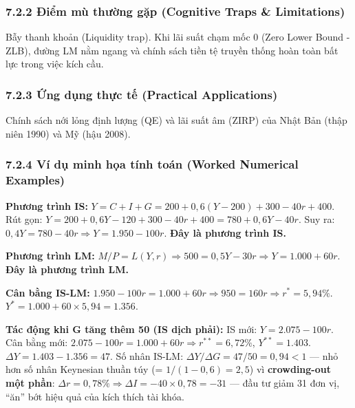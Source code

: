 \documentclass[
]{article}
\begin{document}
\subsubsection{7.2.2 Điểm mù thường gặp (Cognitive Traps \&
Limitations)}\label{ux111iux1ec3m-muxf9-thux1b0ux1eddng-gux1eb7p-cognitive-traps-limitations-34}

Bẫy thanh khoản (Liquidity trap). Khi lãi suất chạm mốc 0 (Zero Lower
Bound - ZLB), đường LM nằm ngang và chính sách tiền tệ truyền thống hoàn
toàn bất lực trong việc kích cầu.

\subsubsection{7.2.3 Ứng dụng thực tế (Practical
Applications)}\label{ux1ee9ng-dux1ee5ng-thux1ef1c-tux1ebf-practical-applications-18}

Chính sách nới lỏng định lượng (QE) và lãi suất âm (ZIRP) của Nhật Bản
(thập niên 1990) và Mỹ (hậu 2008).

\subsubsection{7.2.4 Ví dụ minh họa tính toán (Worked Numerical
Examples)}\label{vuxed-dux1ee5-minh-hux1ecda-tuxednh-touxe1n-worked-numerical-examples-17}

\textbf{Phương trình IS:}
\(Y = C + I + G = 200 + 0{,}6(Y-200) + 300 - 40r + 400\). Rút gọn:
\(Y = 200 + 0{,}6Y - 120 + 300 - 40r + 400 = 780 + 0{,}6Y - 40r\). Suy
ra: \(0{,}4Y = 780 - 40r \Rightarrow Y = 1.950 - 100r\). \textbf{Đây là
phương trình IS.}

\textbf{Phương trình LM:}
\(M/P = L(Y, r) \Rightarrow 500 = 0{,}5Y - 30r \Rightarrow Y = 1.000 + 60r\).
\textbf{Đây là phương trình LM.}

\textbf{Cân bằng IS-LM:}
\(1.950 - 100r = 1.000 + 60r \Rightarrow 950 = 160r \Rightarrow r^* = 5{,}94\%\).
\(Y^* = 1.000 + 60 \times 5{,}94 = 1.356\).

\textbf{Tác động khi G tăng thêm 50 (IS dịch phải):} IS mới:
\(Y = 2.075 - 100r\). Cân bằng mới:
\(2.075 - 100r = 1.000 + 60r \Rightarrow r^{**} = 6{,}72\%\),
\(Y^{**} = 1.403\). \(\Delta Y = 1.403 - 1.356 = 47\). Số nhân IS-LM:
\(\Delta Y / \Delta G = 47/50 = 0{,}94 < 1\) --- nhỏ hơn số nhân
Keynesian thuần túy (= \(1/(1-0{,}6) = 2{,}5\)) vì \textbf{crowding-out
một phần}:
\(\Delta r = 0{,}78\% \Rightarrow \Delta I = -40 \times 0{,}78 = -31\)
--- đầu tư giảm 31 đơn vị, ``ăn'' bớt hiệu quả của kích thích tài khóa.
\end{document}
